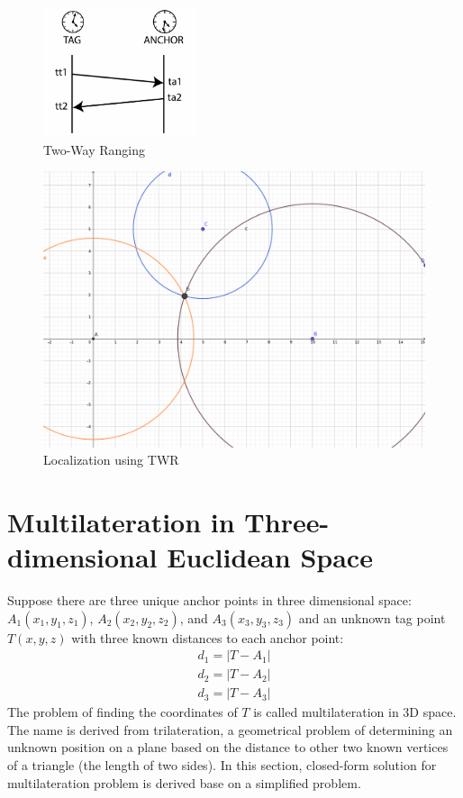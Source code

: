 \documentclass[\main/main.tex]{subfiles}
\begin{document}
\begin{figure}[H]
    \centering
    \includegraphics[width=0.4\textwidth]{twr_protocol.png}
    \caption{Two-Way Ranging}
    \label{fig:twr_anchor_and_tag}
\end{figure}

\begin{figure}[H]
    \centering
    \includegraphics[width=1\textwidth]{twr.png}
    \caption{Localization using TWR}
    \label{fig:twr_trilateration}
\end{figure}

\section{Multilateration in Three-dimensional Euclidean Space}
\label{sec:localization_using_multilateration}

Suppose there are three unique anchor points in three dimensional space: $A_1(x_1, y_1,z_1)$, $A_2(x_2, y_2,z_2)$,
and $A_3(x_3, y_3,z_3)$ and an unknown tag point $T(x,y,z)$ with three known distances to each anchor point:
\begin{equation}
    \begin{split}
        d_1 = | T - A_1| \\
        d_2 = | T - A_2| \\
        d_3 = | T - A_3|
    \end{split}
\end{equation}
The problem of finding the coordinates of $T$ is called multilateration in 3D space. The name is derived from trilateration, a  geometrical problem of determining an unknown position on a plane based on the distance to other two known vertices of a triangle (the length of two sides). In this section, closed-form solution for multilateration problem is derived base on a simplified problem.
\end{document}
